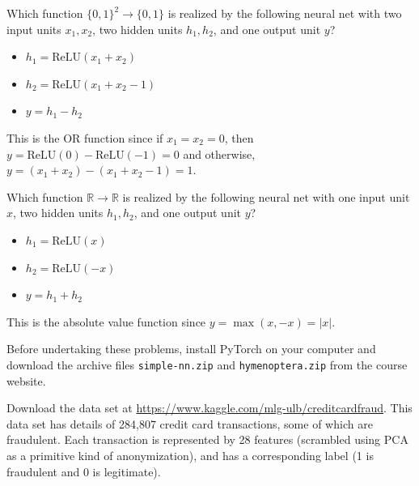 \documentclass{article}
\newcommand{\R}{\mathbb{R}}
\begin{document}
\begin{probset}
\newpage

\begin{prob}
    \begin{subprobset}
    \begin{subprob}
        Which function $\{0, 1\}^2 \rightarrow \{0, 1\}$ is realized by the following neural net with two input units $x_1, x_2$, two hidden units $h_1, h_2$, and one output unit $y$?
        \begin{itemize}
            \item $h_1 = \text{ReLU}(x_1 + x_2)$
            \item $h_2 = \text{ReLU}(x_1 + x_2 - 1)$
            \item $y = h_1 - h_2$
        \end{itemize}

        \begin{soln}
            This is the OR function since if $x_1 = x_2 = 0$, then $y = \text{ReLU}(0) - \text{ReLU}(-1) = 0$ and otherwise, $y = (x_1 + x_2) - (x_1 + x_2 - 1) = 1$.
        \end{soln}
    \end{subprob}

    \begin{subprob}
        Which function $\R \rightarrow \R$ is realized by the following neural net with one input unit $x$, two hidden units $h_1, h_2$, and one output unit $y$?
        \begin{itemize}
            \item $h_1 = \text{ReLU}(x)$
            \item $h_2 = \text{ReLU}(-x)$
            \item $y = h_1 + h_2$
        \end{itemize}

        \begin{soln}
            This is the absolute value function since $y = \max(x, -x) = |x|$.
        \end{soln}
    \end{subprob}
    \end{subprobset}
\end{prob}

{}

Before undertaking these problems, install PyTorch on your computer and download the archive files \texttt{simple-nn.zip} and \texttt{hymenoptera.zip} from the course website.

\begin{progprob}
    Download the data set at \url{https://www.kaggle.com/mlg-ulb/creditcardfraud}. This data set has details of 284,807 credit card transactions, some of which are fraudulent. Each transaction is represented by 28 features (scrambled using PCA as a primitive kind of anonymization), and has a corresponding label (1 is fraudulent and 0 is legitimate).


\end{progprob}
\end{probset}
\end{document}
